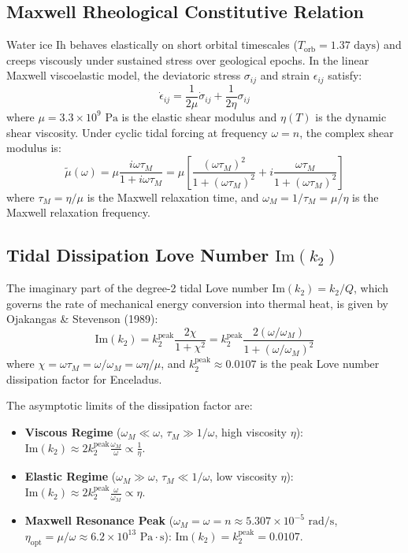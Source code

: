 \documentclass[11pt,a4paper]{article}
\begin{document}
\subsection{Maxwell Rheological Constitutive Relation}
Water ice Ih behaves elastically on short orbital timescales ($T_{\text{orb}} = 1.37\text{ days}$) and creeps viscously under sustained stress over geological epochs. In the linear Maxwell viscoelastic model, the deviatoric stress $\sigma_{ij}$ and strain $\epsilon_{ij}$ satisfy:
\begin{equation}
\dot{\epsilon}_{ij} = \frac{1}{2\mu} \dot{\sigma}_{ij} + \frac{1}{2\eta} \sigma_{ij}
\end{equation}
where $\mu = 3.3 \times 10^9\text{ Pa}$ is the elastic shear modulus and $\eta(T)$ is the dynamic shear viscosity. Under cyclic tidal forcing at frequency $\omega = n$, the complex shear modulus is:
\begin{equation}
\tilde{\mu}(\omega) = \mu \frac{i \omega \tau_M}{1 + i \omega \tau_M} = \mu \left[ \frac{(\omega \tau_M)^2}{1 + (\omega \tau_M)^2} + i \frac{\omega \tau_M}{1 + (\omega \tau_M)^2} \right]
\end{equation}
where $\tau_M = \eta / \mu$ is the Maxwell relaxation time, and $\omega_M = 1/\tau_M = \mu/\eta$ is the Maxwell relaxation frequency.

\subsection{Tidal Dissipation Love Number $\text{Im}(k_2)$}
The imaginary part of the degree-2 tidal Love number $\text{Im}(k_2) = k_2 / Q$, which governs the rate of mechanical energy conversion into thermal heat, is given by Ojakangas \& Stevenson (1989):
\begin{equation}
\text{Im}(k_2) = k_2^{\text{peak}} \frac{2 \chi}{1 + \chi^2} = k_2^{\text{peak}} \frac{2 (\omega / \omega_M)}{1 + (\omega / \omega_M)^2}
\end{equation}
where $\chi = \omega \tau_M = \omega / \omega_M = \omega \eta / \mu$, and $k_2^{\text{peak}} \approx 0.0107$ is the peak Love number dissipation factor for Enceladus.

The asymptotic limits of the dissipation factor are:
\begin{itemize}
    \item \textbf{Viscous Regime} ($\omega_M \ll \omega$, $\tau_M \gg 1/\omega$, high viscosity $\eta$): $\text{Im}(k_2) \approx 2 k_2^{\text{peak}} \frac{\omega_M}{\omega} \propto \frac{1}{\eta}$.
    \item \textbf{Elastic Regime} ($\omega_M \gg \omega$, $\tau_M \ll 1/\omega$, low viscosity $\eta$): $\text{Im}(k_2) \approx 2 k_2^{\text{peak}} \frac{\omega}{\omega_M} \propto \eta$.
    \item \textbf{Maxwell Resonance Peak} ($\omega_M = \omega = n \approx 5.307 \times 10^{-5}\text{ rad/s}$, $\eta_{\text{opt}} = \mu/\omega \approx 6.2 \times 10^{13}\text{ Pa}\cdot\text{s}$): $\text{Im}(k_2) = k_2^{\text{peak}} = 0.0107$.
\end{itemize}
\end{document}
